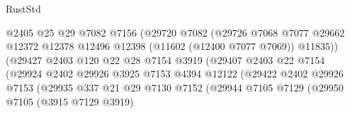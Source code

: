 \begin{lexlean}{RustStd}
\begin{coremodule}
                                        @2405
                                        @25
                                        @29
                                        @7082
                                        @7156
                                        (@29720
                                          @7082
                                          (@29726
                                            @7068
                                            @7077
                                            @29662
                                            @12372
                                            @12378
                                            @12496
                                            @12398
                                            (@11602 (@12400 @7077 @7069))
                                            @11835))
                                        (@29427
                                          @2403
                                          @120
                                          @22
                                          @28
                                          @7154
                                          @3919
                                          (@29407
                                            @2403
                                            @22
                                            @7154
                                            (@29924
                                              @2402
                                              @29926
                                              @3925
                                              @7153
                                              @4394
                                              @12122
                                              (@29422
                                                @2402
                                                @29926
                                                @7153
                                                (@29935
                                                  @337
                                                  @21
                                                  @29
                                                  @7130
                                                  @7152
                                                  (@29944
                                                    @7105
                                                    @7129
                                                    (@29950
                                                      @7105
                                                      (@3915 @7129 @3919)

\end{coremodule}
\end{lexlean}
